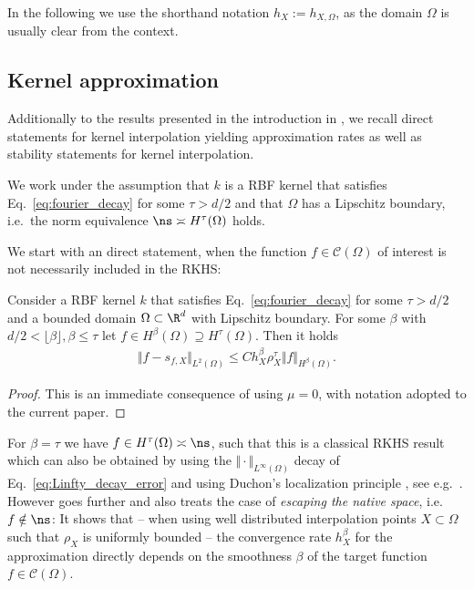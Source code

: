 \documentclass[a4paper, 10pt]{article}
\begin{document}
In the following we use the shorthand notation $h_X := h_{X, \Omega}$, as the domain $\Omega$ is usually clear from the context.





\subsection{Kernel approximation}
\label{subsec:kernel_approx}

Additionally to the results presented in the introduction in , 
we recall direct statements for kernel interpolation yielding approximation rates as well as stability statements for kernel interpolation. 

We work under the assumption that $k$ is a RBF kernel that satisfies Eq.~\eqref{eq:fourier_decay} for some $\tau > d/2$ and that $\Omega$ has a Lipschitz boundary, 
i.e.\ the norm equivalence $\ns \asymp H^\tau(\Omega)$ holds.

We start with an direct statement, when the function $f \in \mathcal{C}(\Omega)$ of interest is not necessarily included in the RKHS: %

\begin{theorem}
\label{th:error_estimate}
Consider a RBF kernel $k$ that satisfies Eq.\ \eqref{eq:fourier_decay} for some $\tau > d/2$ and a bounded domain $\Omega \subset \R^d$ with Lipschitz boundary.
For some $\beta$ with $d/2 < \lfloor \beta \rfloor, \beta \leq \tau$
let $f \in H^\beta(\Omega) \supseteq H^\tau(\Omega)$.
Then it holds
\begin{align*}
\Vert f - s_{f,X} \Vert_{L^2(\Omega)} \leq C h_{X}^\beta \rho_{X}^\tau \Vert f \Vert_{H^\beta(\Omega)}.
\end{align*}
\end{theorem}

\begin{proof}
This is an immediate consequence of \cite[Theorem 4.2]{narcowich2006sobolev} using $\mu = 0$, 
with notation adopted to the current paper.
\end{proof}

\noindent For $\beta = \tau$ we have $f \in H^\tau(\Omega) \asymp \ns$, such that this is a classical RKHS result which can also be obtained by using the $\Vert \cdot \Vert_{L^\infty(\Omega)}$ decay of Eq.~\eqref{eq:Linfty_decay_error} and using Duchon's localization principle \cite{duchon1978erreur}, see e.g.\ \cite{wendland1997sobolev}.
However  goes further and also treats the case of \textit{escaping the native space}, i.e.\ $f \notin \ns$: 
It shows that 
-- when using well distributed interpolation points $X \subset \Omega$ such that $\rho_X$ is uniformly bounded -- 
the convergence rate $h_X^\beta$ for the approximation directly depends on the smoothness $\beta$ of the target function $f \in \mathcal{C}(\Omega)$.
\end{document}
